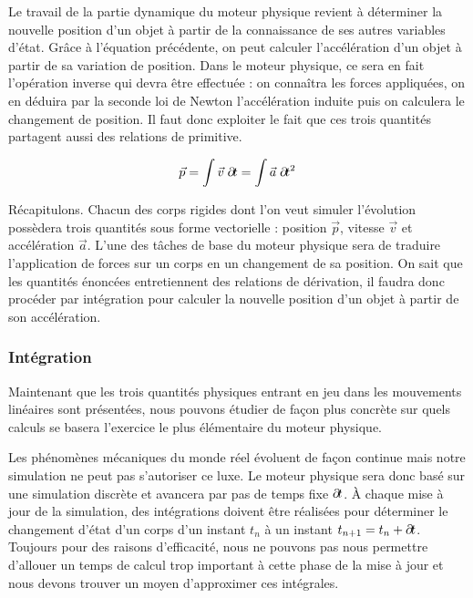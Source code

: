 Le travail de la partie dynamique du moteur physique revient à
déterminer la nouvelle position d'un objet à partir de la connaissance
de ses autres variables d'état. Grâce à l'équation précédente, on peut
calculer l'accélération d'un objet à partir de sa variation de
position. Dans le moteur physique, ce sera en fait l'opération inverse
qui devra être effectuée : on connaîtra les forces appliquées, on en
déduira par la seconde loi de Newton l'accélération induite puis on
calculera le changement de position. Il faut donc exploiter le fait
que ces trois quantités partagent aussi des relations de primitive.

\begin{align*}
  \vec{p} = \int \vec{v}\; \partial \! t = \int \vec{a}\; \partial \! t^2 \\
\end{align*}

Récapitulons. Chacun des corps rigides dont l'on veut simuler
l'évolution possèdera trois quantités sous forme vectorielle :
position $\vec p$, vitesse $\vec v$ et accélération $\vec a$. L'une
des tâches de base du moteur physique sera de traduire l'application
de forces sur un corps en un changement de sa position. On sait que
les quantités énoncées entretiennent des relations de dérivation, il
faudra donc procéder par intégration pour calculer la nouvelle
position d'un objet à partir de son accélération.

\subsubsection{Intégration}

Maintenant que les trois quantités physiques entrant en jeu dans les
mouvements linéaires sont présentées, nous pouvons étudier de façon
plus concrète sur quels calculs se basera l'exercice le plus
élémentaire du moteur physique.

Les phénomènes mécaniques du monde réel évoluent de façon continue
mais notre simulation ne peut pas s'autoriser ce luxe. Le moteur
physique sera donc basé sur une simulation discrète et avancera par pas
de temps fixe $\partial \! t$. \`A chaque mise à jour de la simulation, des
intégrations doivent être réalisées pour déterminer le changement
d'état d'un corps d'un instant $t_n$ à un instant $t_{n+1} = t_n +
\partial \! t$. Toujours pour des raisons d'efficacité, nous ne pouvons pas
nous permettre d'allouer un temps de calcul trop important à cette
phase de la mise à jour et nous devons trouver un moyen d'approximer
ces intégrales.

